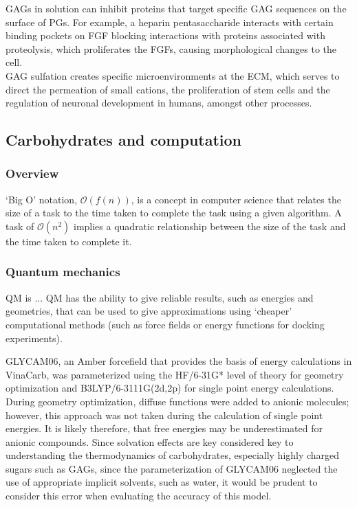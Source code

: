 \documentclass[journal=jctcce,manuscript=article]{achemso}
\begin{document}
{GAGs in solution can inhibit proteins that target specific GAG sequences on the surface of \acp{PG}. For example, a heparin pentasaccharide interacts with certain binding pockets on \ac{FGF} blocking interactions with proteins associated with proteolysis, which proliferates the \acp{FGF}, causing morphological changes to the cell\cite{SoaresdaCosta2017SulfationDisorders}. 
\\
GAG sulfation creates specific microenvironments at the \ac{ECM}, which serves to direct the permeation of small cations, the proliferation of stem cells and the regulation of neuronal development in humans, amongst other processes. 



\pagebreak
\subsection{Carbohydrates and computation}
\subsubsection{Overview}

`Big O'  notation, $\mathcal{O}(f(n))$, is a concept in computer science that relates the size of a task to the time taken to complete the task using a given algorithm. A task of $\mathcal{O}(n^{2})$ implies a quadratic relationship between the size of the task and the time taken to complete it.

\subsubsection{Quantum mechanics}
\Ac{QM} is ...
\Ac{QM} has the ability to give reliable results, such as energies and geometries, that can be used to give approximations using `cheaper' computational methods (such as force fields or energy functions for docking experiments). 

GLYCAM06, an Amber forcefield that provides the basis of energy calculations in VinaCarb, was parameterized using the HF/6-31G* level of theory for geometry optimization and B3LYP/6-3111G(2d,2p) for single point energy calculations\cite{Kirschner2008GLYCAM06:Carbohydrates}. 
During geometry optimization, diffuse functions were added to anionic molecules; however, this approach was not taken during the calculation of single point energies. It is likely therefore, that free energies may be underestimated for anionic compounds. Since solvation effects are key considered key to understanding the thermodynamics of carbohydrates, especially highly charged sugars such as \acp{GAG}, since the parameterization of GLYCAM06 neglected the use of appropriate implicit solvents, such as water, it would be prudent to consider this error when evaluating the accuracy of this model. 

}
\end{document}

